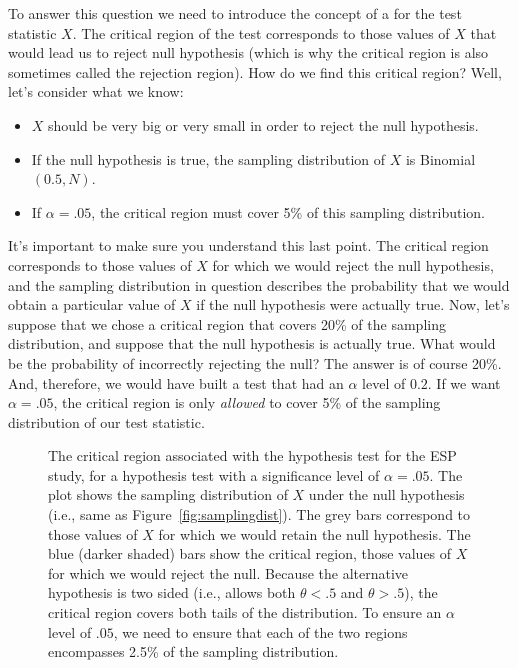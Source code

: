 
To answer this question we need to introduce the concept of a  for the test statistic $X$. The critical region of the test corresponds to those values of $X$ that would lead us to reject null hypothesis (which is why the critical region is also sometimes called the rejection region). How do we find this critical region? Well, let's consider what we know: 
\begin{itemize} \itemsep -2pt
\item $X$ should be very big or very small in order to reject the null hypothesis.
\item If the null hypothesis is true, the sampling distribution of $X$ is Binomial$(0.5, N)$.
\item If $\alpha =.05$, the critical region must cover 5\% of this sampling distribution. 
\end{itemize}
It's important to make sure you understand this last point. The critical region corresponds to those values of $X$ for which we would reject the null hypothesis, and the sampling distribution in question describes the probability that we would obtain a particular value of $X$ if the null hypothesis were actually true. Now, let's suppose that we chose a critical region that covers 20\% of the sampling distribution, and suppose that the null hypothesis is actually true. What would be the probability of incorrectly rejecting the null? The answer is of course 20\%. And, therefore, we would have built a test that had an $\alpha$ level of $0.2$. If we want $\alpha = .05$, the critical region is only {\it allowed} to cover 5\% of the sampling distribution of our test statistic.


\begin{figure}[t]
\begin{center}
\caption{The critical region associated with the hypothesis test for the ESP study, for a hypothesis test with a significance level of $\alpha = .05$. The plot shows the sampling distribution of $X$ under the null hypothesis (i.e., same as Figure~\ref{fig:samplingdist}). The grey bars correspond to those values of $X$ for which we would retain the null hypothesis. The blue (darker shaded) bars show the critical region, those values of $X$ for which we would reject the null. Because the alternative hypothesis is two sided (i.e., allows both $\theta <.5$ and $\theta >.5$), the critical region covers both tails of the distribution. To ensure an $\alpha$ level of $.05$, we need to ensure that each of the two regions encompasses 2.5\% of the sampling distribution. }
\HR
\label{fig:crit2}
\end{center}
\end{figure}

